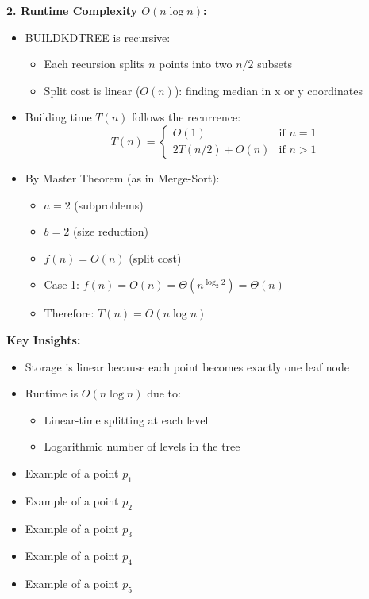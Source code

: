 \textbf{2. Runtime Complexity $O(n \log n)$:}
\begin{itemize}[noitemsep]
    \item BUILDKDTREE is recursive:
        \begin{itemize}[noitemsep]
            \item Each recursion splits $n$ points into two $n/2$ subsets
            \item Split cost is linear ($O(n)$): finding median in x or y coordinates
        \end{itemize}
    \item Building time $T(n)$ follows the recurrence:
        \[ T(n) = \begin{cases}
            O(1) & \text{if } n = 1 \\
            2T(n/2) + O(n) & \text{if } n > 1
        \end{cases} \]
    \item By Master Theorem (as in Merge-Sort):
        \begin{itemize}[noitemsep]
            \item $a = 2$ (subproblems)
            \item $b = 2$ (size reduction)
            \item $f(n) = O(n)$ (split cost)
            \item Case 1: $f(n) = O(n) = \Theta(n^{\log_2 2}) = \Theta(n)$
            \item Therefore: $T(n) = O(n \log n)$
        \end{itemize}
\end{itemize}

\textbf{Key Insights:}
\begin{itemize}[noitemsep]
    \item Storage is linear because each point becomes exactly one leaf node
    \item Runtime is $O(n \log n)$ due to:
        \begin{itemize}[noitemsep]
            \item Linear-time splitting at each level
            \item Logarithmic number of levels in the tree
        \end{itemize}
\end{itemize}

\begin{itemize}
    \item Example of a point $p_1$ \hfill
\end{itemize}

\begin{itemize}
    \item Example of a point $p_2$ \hfill
\end{itemize}

\begin{itemize}
    \item Example of a point $p_3$ \hfill
\end{itemize}

\begin{itemize}
    \item Example of a point $p_4$ \hfill
\end{itemize}

\begin{itemize}
    \item Example of a point $p_5$ \hfill
\end{itemize}
